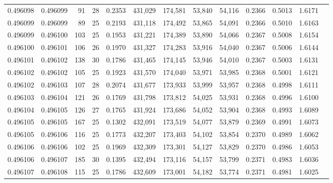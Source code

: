 \begin{tabular}{rrrrrrrrrrrrr}
0.496098 & 0.496099 &  91 &  28 &                                     0.2353 & 431,029 & 174,581 &  53,840 &  54,116 & 0.2366 & 0.5013 & 1.6171 \\
0.496099 & 0.496099 &  89 &  25 &                                     0.2193 & 431,118 & 174,492 &  53,865 &  54,091 & 0.2366 & 0.5010 & 1.6163 \\
0.496099 & 0.496100 & 103 &  25 &                                     0.1953 & 431,221 & 174,389 &  53,890 &  54,066 & 0.2367 & 0.5008 & 1.6154 \\
0.496100 & 0.496101 & 106 &  26 &                                     0.1970 & 431,327 & 174,283 &  53,916 &  54,040 & 0.2367 & 0.5006 & 1.6144 \\
0.496101 & 0.496102 & 138 &  30 &                                     0.1786 & 431,465 & 174,145 &  53,946 &  54,010 & 0.2367 & 0.5003 & 1.6131 \\
0.496102 & 0.496102 & 105 &  25 &                                     0.1923 & 431,570 & 174,040 &  53,971 &  53,985 & 0.2368 & 0.5001 & 1.6121 \\
0.496102 & 0.496103 & 107 &  28 &                                     0.2074 & 431,677 & 173,933 &  53,999 &  53,957 & 0.2368 & 0.4998 & 1.6111 \\
0.496103 & 0.496104 & 121 &  26 &                                     0.1769 & 431,798 & 173,812 &  54,025 &  53,931 & 0.2368 & 0.4996 & 1.6100 \\
0.496104 & 0.496105 & 126 &  27 &                                     0.1765 & 431,924 & 173,686 &  54,052 &  53,904 & 0.2368 & 0.4993 & 1.6089 \\
0.496105 & 0.496105 & 167 &  25 &                                     0.1302 & 432,091 & 173,519 &  54,077 &  53,879 & 0.2369 & 0.4991 & 1.6073 \\
0.496105 & 0.496106 & 116 &  25 &                                     0.1773 & 432,207 & 173,403 &  54,102 &  53,854 & 0.2370 & 0.4989 & 1.6062 \\
0.496106 & 0.496106 & 102 &  25 &                                     0.1969 & 432,309 & 173,301 &  54,127 &  53,829 & 0.2370 & 0.4986 & 1.6053 \\
0.496106 & 0.496107 & 185 &  30 &                                     0.1395 & 432,494 & 173,116 &  54,157 &  53,799 & 0.2371 & 0.4983 & 1.6036 \\
0.496107 & 0.496108 & 115 &  25 &                                     0.1786 & 432,609 & 173,001 &  54,182 &  53,774 & 0.2371 & 0.4981 & 1.6025 \\

\end{tabular}
